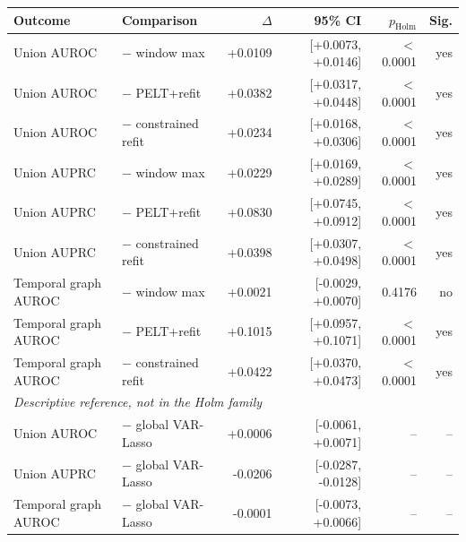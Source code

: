 \begin{tabular}{llrrrr}
\toprule
Outcome & Comparison & $\Delta$ & 95\% CI & $p_{\mathrm{Holm}}$ & Sig. \\
\midrule
Union AUROC & $-$ window max & +0.0109 & [+0.0073, +0.0146] & $<$0.0001 & yes \\
Union AUROC & $-$ PELT+refit & +0.0382 & [+0.0317, +0.0448] & $<$0.0001 & yes \\
Union AUROC & $-$ constrained refit & +0.0234 & [+0.0168, +0.0306] & $<$0.0001 & yes \\
Union AUPRC & $-$ window max & +0.0229 & [+0.0169, +0.0289] & $<$0.0001 & yes \\
Union AUPRC & $-$ PELT+refit & +0.0830 & [+0.0745, +0.0912] & $<$0.0001 & yes \\
Union AUPRC & $-$ constrained refit & +0.0398 & [+0.0307, +0.0498] & $<$0.0001 & yes \\
Temporal graph AUROC & $-$ window max & +0.0021 & [-0.0029, +0.0070] & 0.4176 & no \\
Temporal graph AUROC & $-$ PELT+refit & +0.1015 & [+0.0957, +0.1071] & $<$0.0001 & yes \\
Temporal graph AUROC & $-$ constrained refit & +0.0422 & [+0.0370, +0.0473] & $<$0.0001 & yes \\
\midrule
\multicolumn{6}{l}{\emph{Descriptive reference, not in the Holm family}} \\
Union AUROC & $-$ global VAR-Lasso & +0.0006 & [-0.0061, +0.0071] & -- & -- \\
Union AUPRC & $-$ global VAR-Lasso & -0.0206 & [-0.0287, -0.0128] & -- & -- \\
Temporal graph AUROC & $-$ global VAR-Lasso & -0.0001 & [-0.0073, +0.0066] & -- & -- \\
\bottomrule
\end{tabular}
